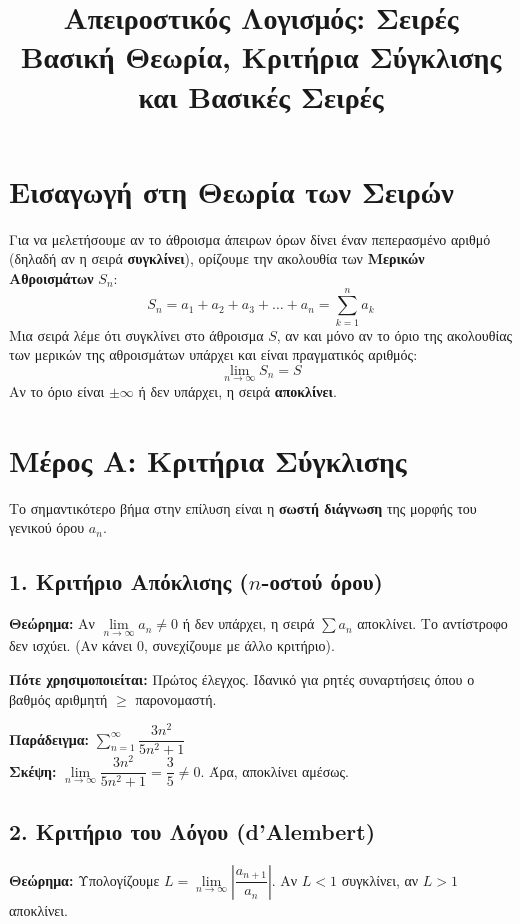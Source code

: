 \documentclass[11pt,a4paper]{article}
\title{\textbf{Απειροστικός Λογισμός: Σειρές}\\ \large{Βασική Θεωρία, Κριτήρια Σύγκλισης και Βασικές Σειρές}}
\newcommand{\eng}[1]{\selectlanguage{english}#1\selectlanguage{greek}}
\begin{document}
\maketitle

\section*{Εισαγωγή στη Θεωρία των Σειρών}

Για να μελετήσουμε αν το άθροισμα άπειρων όρων δίνει έναν πεπερασμένο αριθμό (δηλαδή αν η σειρά \textbf{συγκλίνει}), ορίζουμε την ακολουθία των \textbf{Μερικών Αθροισμάτων} $S_n$:
\[ S_n = a_1 + a_2 + a_3 + \dots + a_n = \displaystyle\sum_{k=1}^{n} a_k \]
Μια σειρά λέμε ότι συγκλίνει στο άθροισμα $S$, αν και μόνο αν το όριο της ακολουθίας των μερικών της αθροισμάτων υπάρχει και είναι πραγματικός αριθμός:
\[ \lim\limits_{n \to \infty} S_n = S \]
Αν το όριο είναι $\pm \infty$ ή δεν υπάρχει, η σειρά \textbf{αποκλίνει}.

\hrulefill

\section*{Μέρος Α: Κριτήρια Σύγκλισης}
Το σημαντικότερο βήμα στην επίλυση είναι η \textbf{σωστή διάγνωση} της μορφής του γενικού όρου $a_n$.

\subsection*{1. Κριτήριο Απόκλισης ($n$-οστού όρου)}
\textbf{Θεώρημα:} Αν $\lim\limits_{n \to \infty} a_n \neq 0$ ή δεν υπάρχει, η σειρά $\sum a_n$ αποκλίνει. Το αντίστροφο δεν ισχύει. (Αν κάνει 0, συνεχίζουμε με άλλο κριτήριο).

\vspace{0.2cm}
\noindent \textbf{Πότε χρησιμοποιείται:} Πρώτος έλεγχος. Ιδανικό για ρητές συναρτήσεις όπου ο βαθμός αριθμητή $\geq$ παρονομαστή.

\vspace{0.2cm}
\noindent \textbf{Παράδειγμα:} $\displaystyle\sum_{n=1}^{\infty} \dfrac{3n^2}{5n^2+1}$ \\
\textbf{Σκέψη:} $\lim\limits_{n \to \infty} \dfrac{3n^2}{5n^2+1} = \dfrac{3}{5} \neq 0$. Άρα, αποκλίνει αμέσως.

\subsection*{2. Κριτήριο του Λόγου (\eng{d'Alembert})}
\textbf{Θεώρημα:} Υπολογίζουμε $L = \lim\limits_{n \to \infty} \left| \dfrac{a_{n+1}}{a_n} \right|$. Αν $L < 1$ συγκλίνει, αν $L > 1$ αποκλίνει.
\end{document}
